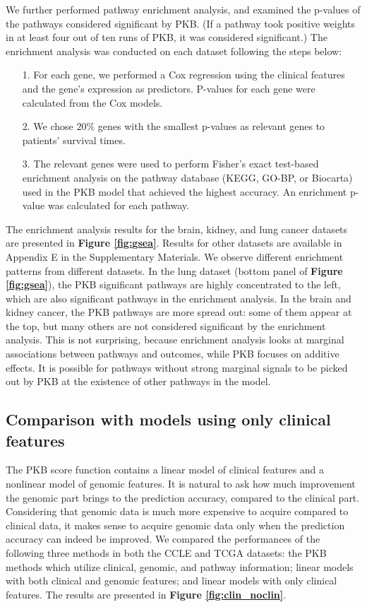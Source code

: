 \documentclass[a4paper,12pt]{article}
\begin{document}
We further performed pathway enrichment analysis, and examined the p-values of the pathways considered significant by PKB. (If a pathway took positive weights in at least four out of ten runs of PKB, it was considered significant.) The enrichment analysis was conducted on each dataset following the steps below:
\begin{itemize}
	\item[1.] For each gene, we performed a Cox regression using the clinical features and the gene's expression as predictors. P-values for each gene were calculated from the Cox models.
	\item[2.] We chose $20\%$ genes with the smallest p-values as relevant genes to patients' survival times. 
	\item[3.] The relevant genes were used to perform Fisher's exact test-based  enrichment analysis \citep{huang2008bioinformatics} on the pathway database (KEGG, GO-BP, or Biocarta) used in the PKB model that achieved the highest accuracy. An enrichment p-value was calculated for each pathway.
\end{itemize}

The enrichment analysis results for the brain, kidney, and lung cancer datasets are presented in \textbf{Figure \ref{fig:gsea}}. Results for other datasets are available in Appendix E in the Supplementary Materials. We observe different enrichment patterns from different datasets. In the lung dataset (bottom panel of \textbf{Figure \ref{fig:gsea}}), the PKB significant pathways are highly concentrated to the left, which are also significant pathways in the enrichment analysis. In the brain and kidney cancer, the PKB pathways are more spread out: some of them appear at the top, but many others are not considered significant by the enrichment analysis. This is not surprising, because enrichment analysis looks at marginal associations between pathways and outcomes, while PKB focuses on additive effects. It is possible for pathways without strong marginal signals to be picked out by PKB at the existence of other pathways in the model.


\subsection{Comparison with models using only clinical features}

The PKB score function contains a linear model of clinical features and a nonlinear model of genomic features. It is natural to ask how much improvement the genomic part brings to the prediction accuracy, compared to the clinical part. Considering that genomic data is much more expensive to acquire compared to clinical data, it makes sense to acquire genomic data only when the prediction accuracy can indeed be improved. We compared the performances of the following three methods in both the CCLE and TCGA datasets: the PKB methods which utilize clinical, genomic, and pathway information; linear models with both clinical and genomic features; and linear models with only clinical features. The results are presented in \textbf{Figure \ref{fig:clin_noclin}}. 
\end{document}
